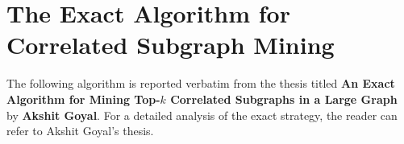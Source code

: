 \documentclass[MTech]{iitddiss}
\begin{document}






\vspace{-4mm}







% 

%   
% 
% 





\appendix

\chapter{The Exact Algorithm for Correlated Subgraph Mining}

The following algorithm is reported verbatim from the thesis titled 
\textbf{An Exact Algorithm for Mining Top-$k$ Correlated Subgraphs in a Large
Graph} by \textbf{Akshit Goyal}. For a detailed analysis of the exact
strategy, the reader can refer to Akshit Goyal's thesis. 
\end{document}
